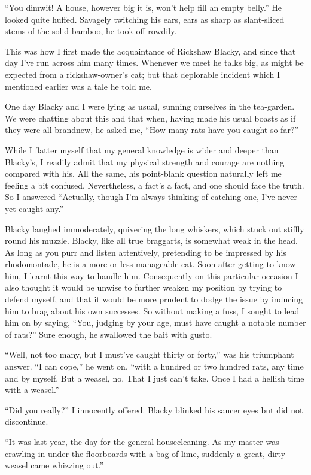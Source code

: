 \documentclass[12pt, openright]{book}
\begin{document}
``You dimwit! A house, however big it is, won't help fill an empty
belly.'' He looked quite huffed. Savagely twitching his ears, ears as
sharp as slant-sliced stems of the solid bamboo, he took off rowdily.

This was how I first made the acquaintance of Rickshaw Black\-y, and since
that day I've run across him many times. Whenever we meet he talks big,
as might be expected from a rickshaw-owner's cat; but that deplorable
incident which I mentioned earlier was a tale he told me.

One day Blacky and I were lying as usual, sunning ourselves in the
tea-garden. We were chatting about this and that when, having made his
usual boasts as if they were all brandnew, he asked me, ``How many rats
have you caught so far?''

While I flatter myself that my general knowledge is wider and deeper
than Blacky's, I readily admit that my physical strength and courage are
nothing compared with his. All the same, his point-blank question
naturally left me feeling a bit confused. Nevertheless, a fact's a fact,
and one should face the truth. So I answered ``Actually, though I'm
always thinking of catching one, I've never yet caught any.''

Blacky laughed immoderately, quivering the long whiskers, which stuck
out stiffly round his muzzle. Blacky, like all true braggarts, is
somewhat weak in the head. As long as you purr and listen attentively,
pretending to be impressed by his rhodomontade, he is a more or less
manageable cat. Soon after getting to know him, I learnt this way to
handle him. Consequently on this particular occasion I also thought it
would be unwise to further weaken my position by trying to defend
myself, and that it would be more prudent to dodge the issue by inducing
him to brag about his own successes. So without making a fuss, I sought
to lead him on by saying, ``You, judging by your age, must have caught a
notable number of rats?'' Sure enough, he swallowed the bait with gusto.

``Well, not too many, but I must've caught thirty or forty,'' was his
triumphant answer. ``I can cope,'' he went on, ``with a hundred or two
hundred rats, any time and by myself. But a weasel, no. That I just
can't take. Once I had a hellish time with a weasel.''

``Did you really?'' I innocently offered. Blacky blinked his saucer eyes
but did not discontinue.

``It was last year, the day for the general housecleaning. As my master
was crawling in under the floorboards with a bag of lime, suddenly a
great, dirty weasel came whizzing out.''
\end{document}
